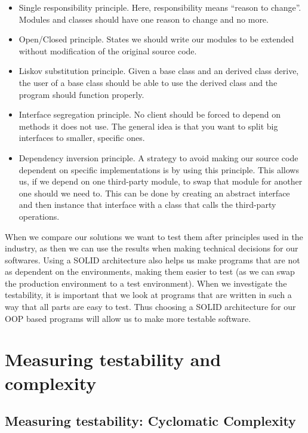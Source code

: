 \documentclass[12pt]{report}
\theoremstyle{definition}
\theoremstyle{theorem}
\begin{document}
\begin{itemize}
    \item Single responsibility principle. Here, responsibility means ``reason
        to change''. Modules and classes should have one reason to change and no
        more.
    \item Open/Closed principle. States we should write our modules to be
        extended without modification of the original source code.
    \item Liskov substitution principle. Given a base class and an derived
        class derive, the user of a base class should be able to use the derived
        class and the program should function properly.
    \item Interface segregation principle. No client should be forced to depend
        on methods it does not use. The general idea is that you want to split
        big interfaces to smaller, specific ones.
    \item Dependency inversion principle. A strategy to avoid making our source
        code dependent on specific implementations is by using this principle.
        This allows us, if we depend on one third-party module, to swap that
        module for another one should we need to. This can be done by creating
        an abstract interface and then instance that interface with a class that
        calls the third-party operations.~\cite{martinrobert}
\end{itemize}

When we compare our solutions we want to test them after principles used in the
industry, as then we can use the results when making technical decisions for our
softwares. Using a SOLID architecture also helps us make programs that are not
as dependent on the environments, making them easier to test (as we can swap the
production environment to a test environment). When we investigate the
testability, it is important that we look at programs that are written in such a
way that all parts are easy to test. Thus choosing a SOLID architecture for our
OOP based programs will allow us to make more testable software.

\chapter{Measuring testability and complexity}\label{methods}

\section{Measuring testability: Cyclomatic Complexity}\label{cyclomaticcomplexity}
\end{document}
